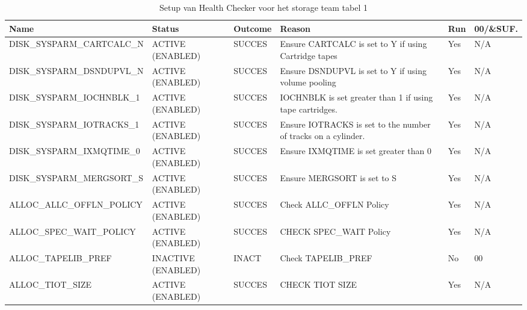 \begin{landscape}
	\begin{table}[h]
		\begin{tabular}{|l|p{2.3cm}|l|p{4.5cm}|l|l|}
			\hline
			\textbf{Name}                       & \textbf{Status}   & \textbf{Outcome} & \textbf{Reason}    & \textbf{Run} &	\textbf{00/\&SUF.} \\ \hline
			DISK\_SYSPARM\_CARTCALC\_N & ACTIVE (ENABLED)   & SUCCES & Ensure   CARTCALC is set to Y if using Cartridge tapes               & Yes & N/A \\ \hline
			DISK\_SYSPARM\_DSNDUPVL\_N & ACTIVE (ENABLED)   & SUCCES & Ensure   DSNDUPVL is set to Y if using volume pooling                & Yes & N/A \\ \hline
			DISK\_SYSPARM\_IOCHNBLK\_1 & ACTIVE (ENABLED)   & SUCCES & IOCHNBLK   is set greater than 1 if using   tape   cartridges.       & Yes & N/A \\ \hline
			DISK\_SYSPARM\_IOTRACKS\_1 & ACTIVE (ENABLED)   & SUCCES & Ensure   IOTRACKS is set to the number of    tracks   on a cylinder. & Yes & N/A \\ \hline
			DISK\_SYSPARM\_IXMQTIME\_0 & ACTIVE (ENABLED)   & SUCCES & Ensure   IXMQTIME is set greater than 0                              & Yes & N/A \\ \hline
			DISK\_SYSPARM\_MERGSORT\_S & ACTIVE (ENABLED)   & SUCCES & Ensure   MERGSORT is set to S                                        & Yes & N/A \\ \hline
			ALLOC\_ALLC\_OFFLN\_POLICY & ACTIVE (ENABLED)   & SUCCES & Check   ALLC\_OFFLN Policy                                           & Yes & N/A \\ \hline
			ALLOC\_SPEC\_WAIT\_POLICY  & ACTIVE (ENABLED)   & SUCCES & CHECK   SPEC\_WAIT Policy                                            & Yes & N/A \\ \hline
			ALLOC\_TAPELIB\_PREF       & INACTIVE (ENABLED) & INACT  & Check   TAPELIB\_PREF                                                & No  & 00  \\ \hline
			ALLOC\_TIOT\_SIZE          & ACTIVE (ENABLED)   & SUCCES & CHECK   TIOT SIZE                                                    & Yes & N/A \\ \hline
		\end{tabular}
		\caption[Health Checker Storage team tabel 1]{Setup van Health Checker voor het storage team tabel 1}
		\label{tbl:Storage Team Tabel 1}
	\end{table}
\end{landscape}

